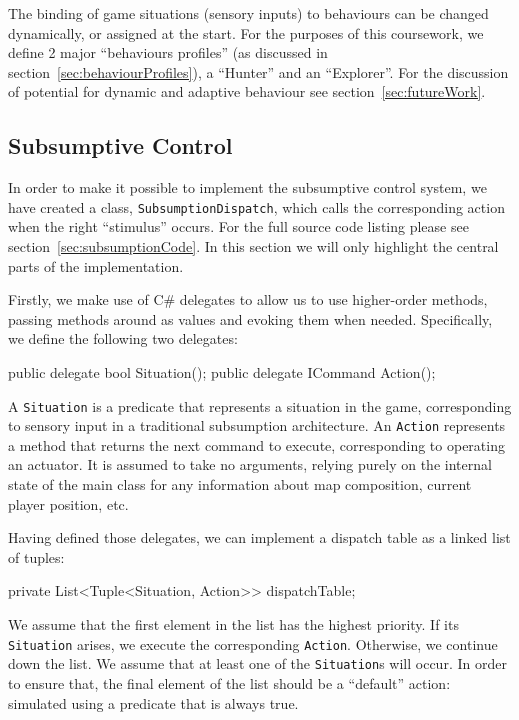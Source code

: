 \documentclass[11pt]{article}
\begin{document}
The binding of game situations (sensory inputs) to behaviours can be changed dynamically, or assigned at the start. For the purposes of this coursework, we define 2 major ``behaviours profiles'' (as discussed in section~\ref{sec:behaviourProfiles}), a ``Hunter'' and an ``Explorer''. For the discussion of potential for dynamic and adaptive behaviour see section~\ref{sec:futureWork}.
\subsection{Subsumptive Control}

In order to make it possible to implement the subsumptive control system, we have created a class, \verb|SubsumptionDispatch|, which calls the corresponding action when the right ``stimulus'' occurs. For the full source code listing please see section~\ref{sec:subsumptionCode}. In this section we will only highlight the central parts of the implementation.

Firstly, we make use of C\# delegates to allow us to use higher-order methods, passing methods around as values and evoking them when needed. Specifically, we define the following two delegates:

\begin{code}
public delegate bool Situation();
public delegate ICommand Action();
\end{code}

A \verb|Situation| is a predicate that represents a situation in the game, corresponding to sensory input in a traditional subsumption architecture. An \verb|Action| represents a method that returns the next command to execute, corresponding to operating an actuator. It is assumed to take no arguments, relying purely on the internal state of the main class for any information about map composition, current player position, etc.

Having defined those delegates, we can implement a dispatch table as a linked list of tuples:

\begin{code}
private List<Tuple<Situation, Action>> dispatchTable;
\end{code}

We assume that the first element in the list has the highest priority. If its \verb|Situation| arises, we execute the corresponding \verb|Action|. Otherwise, we continue down the list. We assume that at least one of the \verb|Situation|s will occur. In order to ensure that, the final element of the list should be a ``default'' action: simulated using a predicate that is always true.
\end{document}
